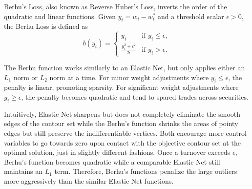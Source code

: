 \documentclass[11pt, letterpaper]{article}
\begin{document}
Berhu's Loss, also known as Reverse Huber's Loss, inverts the order of the quadratic and linear functions. Given
$y_i = w_i - w_i^*$ and a threshold scalar $\epsilon > 0$, the Berhu Loss is defined as
\begin{equation}
\label{berhu_loss}
    b(y_i) = \begin{cases}
        y_i & \text{if } y_i \leq \epsilon, \\
        \frac{y_i^2 + \epsilon^2}{2\epsilon} & \text{if } y_i > \epsilon.
    \end{cases}
\end{equation}

The Berhu function works similarly to an Elastic Net, but only applies either an $L_1$ norm or $L_2$ norm at a time. For minor
weight adjustments where $y_i \leq \epsilon$, the penalty is linear, promoting sparsity. For significant weight adjustments
where $y_i \geq \epsilon$, the penalty becomes quadratic and tend to spared trades across securities.

Intuitively, Elastic Net sharpens but does not completely eliminate the smooth edges of the contour set while the Berhu's
function shrinks the areas of pointy edges but still preserve the indifferentiable vertices. Both encourage more control
variables to go towards zero upon contact with the objective contour set at the optimal solution, just in slightly different
fashions. Once a turnover exceeds $\epsilon$, Berhu's function becomes quadratic while a comparable Elastic Net still maintains an $L_1$
term. Therefore, Berhu's functions penalize the large outliers more aggressively than the similar Elastic Net functions.
\end{document}

